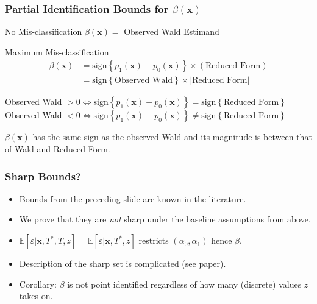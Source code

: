 \documentclass{beamer}
\begin{document}
\begin{frame}
  \frametitle{Partial Identification Bounds for $\beta(\mathbf{x})$}

    \begin{block}{No Mis-classification}
      $\beta(\mathbf{x}) = $ Observed Wald Estimand
    \end{block}

    \begin{block}{Maximum Mis-classification}
      \vspace{-1.5em}
      \begin{align*}
        \beta(\mathbf{x}) &=\mbox{sign}\left\{ p_1(\mathbf{x}) - p_0(\mathbf{x}) \right\}\times (\mbox{Reduced Form})\\
        &=\mbox{sign}\left\{ \mbox{Observed Wald} \right\} \times |\mbox{Reduced Form}|
      \end{align*}
      
      \vspace{1em}
    \footnotesize Observed Wald $> 0\iff \mbox{sign}\left\{ p_1(\mathbf{x}) - p_0(\mathbf{x}) \right\} = \mbox{sign}\left\{ \mbox{Reduced Form} \right\}$ \\
    \footnotesize Observed Wald $< 0\iff \mbox{sign}\left\{ p_1(\mathbf{x}) - p_0(\mathbf{x}) \right\} \neq \mbox{sign}\left\{ \mbox{Reduced Form} \right\}$ 
    \end{block}

    \vspace{1em}
    \begin{alertblock}{
        $\beta(\mathbf{x})$ has the same sign as the observed Wald and its magnitude is between that of Wald and Reduced Form.}
    \end{alertblock}

\end{frame}
\begin{frame}
  \frametitle{Sharp Bounds?}

  \begin{itemize}
    \item Bounds from the preceding slide are known in the literature.
    \item We prove that they are \emph{not} sharp under the baseline assumptions from above.
      \item $\mathbb{E}[\varepsilon|\mathbf{x},T^*,T,z] = \mathbb{E}[\varepsilon|\mathbf{x},T^*,z]$ restricts $(\alpha_0,\alpha_1)$ hence $\beta$.
    \item Description of the sharp set is complicated (see paper). 
    \item Corollary: $\beta$ is not point identified regardless of how many (discrete) values $z$ takes on.
  \end{itemize}


\end{frame}
\end{document}
